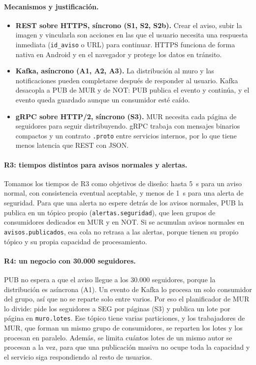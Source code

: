 \paragraph{Mecanismos y justificación.}
\begin{itemize}[leftmargin=*]
  \item \textbf{REST sobre HTTPS, síncrono (S1, S2, S2b).} Crear el aviso, subir la imagen
  y vincularla son acciones en las que el usuario necesita una respuesta inmediata
  (\texttt{id\_aviso} o URL) para continuar. HTTPS funciona de forma nativa en Android y en
  el navegador y protege los datos en tránsito.
  \item \textbf{Kafka, asíncrono (A1, A2, A3).} La distribución al muro y las
  notificaciones pueden completarse después de responder al usuario. Kafka desacopla a PUB
  de MUR y de NOT: PUB publica el evento y continúa, y el evento queda guardado aunque un
  consumidor esté caído.
  \item \textbf{gRPC sobre HTTP/2, síncrono (S3).} MUR necesita cada página de seguidores
  para seguir distribuyendo. gRPC trabaja con mensajes binarios compactos y un contrato
  \texttt{.proto} entre servicios internos, por lo que tiene menos latencia que REST con
  JSON.
\end{itemize}

\paragraph{R3: tiempos distintos para avisos normales y alertas.}
Tomamos los tiempos de R3 como objetivos de diseño: hasta 5~s para un aviso normal, con
consistencia eventual aceptable, y menos de 1~s para una alerta de seguridad. Para que una
alerta no espere detrás de los avisos normales, PUB la publica en un tópico propio
(\texttt{alertas.seguridad}), que leen grupos de consumidores dedicados en MUR y en NOT.
Si se acumulan avisos normales en \texttt{avisos.publicados}, esa cola no retrasa a las
alertas, porque tienen su propio tópico y su propia capacidad de procesamiento.

\paragraph{R4: un negocio con 30.000 seguidores.}
PUB no espera a que el aviso llegue a los 30.000 seguidores, porque la distribución es
asíncrona (A1). Un evento de Kafka lo procesa un solo consumidor del grupo, así que no se
reparte solo entre varios. Por eso el planificador de MUR lo divide: pide los seguidores a
SEG por páginas (S3) y publica un lote por página en \texttt{muro.lotes}. Ese tópico tiene
varias particiones, y los trabajadores de MUR, que forman un mismo grupo de consumidores,
se reparten los lotes y los procesan en paralelo. Además, se limita cuántos lotes de un
mismo autor se procesan a la vez, para que una publicación masiva no ocupe toda la
capacidad y el servicio siga respondiendo al resto de usuarios.

